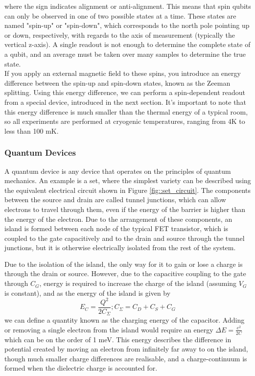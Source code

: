 where the sign indicates alignment or anti-alignment.
This means that spin qubits can only be observed in one of two possible states at a time. These states are named "spin-up" or "spin-down", which corresponds to the north pole pointing up or down, respectively, with regards to the axis of measurement (typically the vertical z-axis). A single readout is not enough to determine the complete state of a qubit, and an average must be taken over many samples to determine the true state. \\
\label{zeeman}
If you apply an external magnetic field to these spins, you introduce an energy difference between the spin-up and spin-down states, known as the Zeeman splitting. Using this energy difference, we can perform a spin-dependent readout from a special device, introduced in the next section. It's important to note that this energy difference is much smaller than the thermal energy of a typical room, so all experiments are performed at cryogenic temperatures, ranging from 4K to less than 100 mK. \cite{morello2010single}
\subsubsection{Quantum Devices}
\label{sec::set}
A quantum device is any device that operates on the principles of quantum mechanics. An example is a \gls{set}, where the simplest variety can be described using the equivalent electrical circuit \cite{devoret2000amplifying} shown in Figure \ref{fig::set_circuit}. The components between the source and drain are called tunnel junctions, which can allow electrons to travel through them, even if the energy of the barrier is higher than the energy of the electron. Due to the arrangement of these components, an island is formed between each node of the typical FET transistor, which is coupled to the gate capacitively and to the drain and source through the tunnel junctions, but it is otherwise electrically isolated from the rest of the system.

Due to the isolation of the island, the only way for it to gain or lose a charge is through the drain or source. However, due to the capacitive coupling to the gate through $C_G$, energy is required to increase the charge of the island (assuming $V_G$ is constant), and as the energy of the island is given by $$E_C = \frac{Q^2}{2 C_\Sigma} ; C_\Sigma = C_D + C_S + C_G$$ we can define a quantity known as the charging energy of the capacitor. Adding or removing a single electron from the island would require an energy $\Delta E = \frac{e^2}{2 C}$ which can be on the order of 1 meV. This energy describes the difference in potential created by moving an electron from infinitely far away to on the island, though much smaller charge differences are realisable, and a charge-continuum is formed when the dielectric charge is accounted for.

